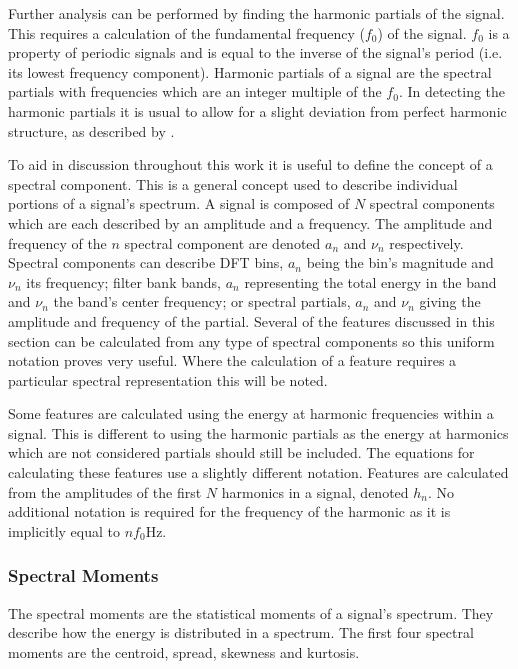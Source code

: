 		Further analysis can be performed by finding the harmonic partials of the signal. This requires a
		calculation of the fundamental frequency ($f_{0}$) of the signal. $f_{0}$ is a property of periodic signals
		and is equal to the inverse of the signal's period (i.e. its lowest frequency component). Harmonic partials
		of a signal are the spectral partials with frequencies which are an integer multiple of the $f_{0}$. In
		detecting the harmonic partials it is usual to allow for a slight deviation from perfect harmonic
		structure, as described by \citet{peeters2011the}.

		To aid in discussion throughout this work it is useful to define the concept of a spectral component. This
		is a general concept used to describe individual portions of a signal's spectrum. A signal is composed of
		$N$ spectral components which are each described by an amplitude and a frequency. The amplitude and
		frequency of the $n$ spectral component are denoted $a_{n}$ and $\nu_{n}$ respectively. Spectral
		components can describe DFT bins, $a_{n}$ being the bin's magnitude and $\nu_{n}$ its frequency; filter
		bank bands, $a_{n}$ representing the total energy in the band and $\nu_{n}$ the band's center frequency; or
		spectral partials, $a_{n}$ and $\nu_{n}$ giving the amplitude and frequency of the partial. Several of the
		features discussed in this section can be calculated from any type of spectral components so this uniform
		notation proves very useful. Where the calculation of a feature requires a particular spectral
		representation this will be noted.

		Some features are calculated using the energy at harmonic frequencies within a signal. This is different to
		using the harmonic partials as the energy at harmonics which are not considered partials should still be
		included. The equations for calculating these features use a slightly different notation. Features are
		calculated from the amplitudes of the first $N$ harmonics in a signal, denoted $h_{n}$. No additional
		notation is required for the frequency of the harmonic as it is implicitly equal to $nf_{0}$Hz.

		\subsubsection*{Spectral Moments}
			The spectral moments are the statistical moments of a signal's spectrum. They describe how the
			energy is distributed in a spectrum. The first four spectral moments are the centroid, spread,
			skewness and kurtosis.

